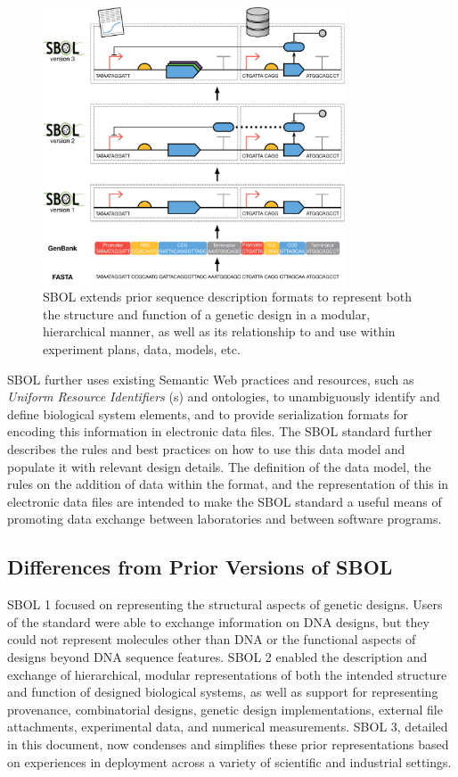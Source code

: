 \begin{figure}[htbp!]
\centering
\includegraphics[width=0.8\textwidth]{images/SBOL3-evolution.pdf}
\caption{SBOL extends prior sequence description formats to represent both the structure and function of a genetic design in a modular, hierarchical manner, as well as its relationship to and use within experiment plans, data, models, etc.}
\label{f:sequence}
\end{figure}

SBOL further uses existing Semantic Web practices and resources, such as \emph{Uniform Resource Identifiers} (s) and ontologies, to unambiguously identify and define biological system elements,
and to provide serialization formats for encoding this information in electronic data files.
The SBOL standard further describes the rules and best practices on how to use this data model and populate it with relevant design details. 
The definition of the data model, the rules on the addition of data within the format, and the representation of this in electronic data files are intended to make the SBOL standard a useful means of promoting data exchange between laboratories and between software programs.

\subsection{Differences from Prior Versions of SBOL}
SBOL 1 focused on representing the structural aspects of genetic designs. Users of the standard were able to exchange information on DNA designs, but they could not represent molecules other than DNA or the functional aspects of designs beyond DNA sequence features. SBOL 2 enabled the description and exchange of hierarchical, modular representations of both the intended structure and function of designed biological systems, as well as support for representing provenance, combinatorial designs, genetic design implementations, external file attachments, experimental data, and numerical measurements. 
SBOL 3, detailed in this document, now condenses and simplifies these prior representations based on experiences in deployment across a variety of scientific and industrial settings.

